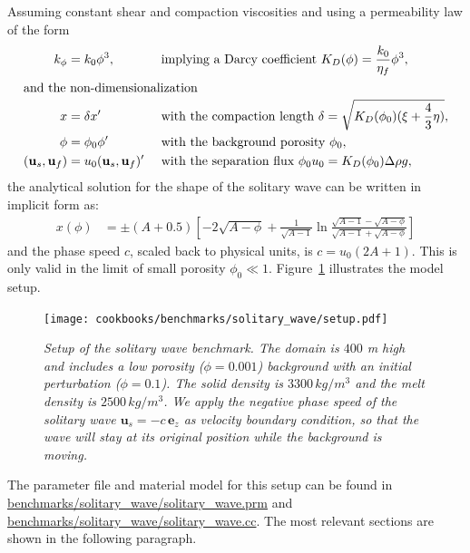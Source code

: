 \documentclass{article}
\begin{document}
Assuming constant shear and compaction viscosities and using a permeability law of the form
%
\begin{align*}
k_\phi &= k_0 \phi^3, && \text{ implying a Darcy coefficient }
K_D(\phi) = \frac{k_0}{\eta_f} \phi^3 , \\
\intertext{and the non-dimensionalization }
x &= \delta x' 
  && \text{ with the compaction length } \delta = \sqrt{K_D(\phi_0)(\xi + \frac{4}{3}\eta)} , \\
\phi &= \phi_0 \phi ' 
  && \text{ with the background porosity } \phi_0 , \\
(\mathbf u_s, \mathbf u_f) &= u_0 (\mathbf u_s, \mathbf u_f)' 
  && \text{ with the separation flux } \phi_0 u_0 = K_D(\phi_0) \Delta\rho g ,
\end{align*}
%
the analytical solution for the shape of the solitary wave can be written in implicit form as:
\begin{align*}
x(\phi) &= \pm (A + 0.5) 
\left[ -2 \sqrt{A-\phi} + \frac{1}{\sqrt{A-1}} 
\ln \frac{\sqrt{A-1} - \sqrt{A-\phi}}{\sqrt{A-1} + \sqrt{A-\phi}} \right]
\end{align*}
and the phase speed $c$, scaled back to physical units, is $c = u_0 (2A+1)$. 
This is only valid in the limit of small porosity $\phi_0 \ll 1$. Figure~\ref{fig:setup-solitary-wave} illustrates the model setup. 

\begin{figure}
  \begin{center}
    \texttt{[image: cookbooks/benchmarks/solitary\_wave/setup.pdf]}
  \end{center}
  \caption{\it Setup of the solitary wave benchmark. The domain is $400$ m high and includes a low porosity
  ($\phi = 0.001$) background with an initial perturbation ($\phi = 0.1$). The solid density is $3300\,kg/m^3$
  and the melt density is $2500\,kg/m^3$. We apply the negative phase speed 
  of the solitary wave $\mathbf u_s = -c \, \mathbf e_z$ as velocity boundary condition, so that the wave will 
  stay at its original position while the background is moving.}
  \label{fig:setup-solitary-wave}
\end{figure}

The parameter file and material model for this setup can be found in \url{benchmarks/solitary_wave/solitary_wave.prm} and \url{benchmarks/solitary_wave/solitary_wave.cc}. The most relevant sections are shown in the following paragraph. 


\end{document}
